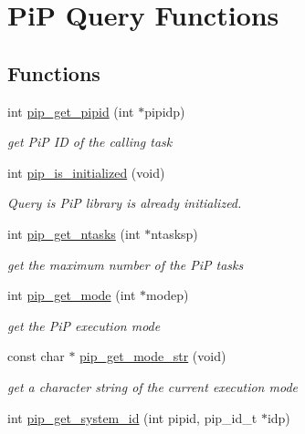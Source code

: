 \hypertarget{group__PiP-4-query}{\section{Pi\-P Query Functions}
\label{group__PiP-4-query}
}
\subsection*{Functions}
\begin{DoxyCompactItemize}
\item 
int \hyperlink{group__PiP-4-query_ga4e715bb8c325e9acc81af0745908dc0e}{pip\-\_\-get\-\_\-pipid} (int $\ast$pipidp)
\begin{DoxyCompactList}\small\item\em get Pi\-P I\-D of the calling task \end{DoxyCompactList}\item 
int \hyperlink{group__PiP-4-query_gabbec4ae2f820b13400f63cba55a53399}{pip\-\_\-is\-\_\-initialized} (void)
\begin{DoxyCompactList}\small\item\em Query is Pi\-P library is already initialized. \end{DoxyCompactList}\item 
int \hyperlink{group__PiP-4-query_ga9786d5aafa2a3882714c35ecc9f39a5a}{pip\-\_\-get\-\_\-ntasks} (int $\ast$ntasksp)
\begin{DoxyCompactList}\small\item\em get the maximum number of the Pi\-P tasks \end{DoxyCompactList}\item 
int \hyperlink{group__PiP-4-query_gab603f68c1ce972a5f3bfb8c95fcfb555}{pip\-\_\-get\-\_\-mode} (int $\ast$modep)
\begin{DoxyCompactList}\small\item\em get the Pi\-P execution mode \end{DoxyCompactList}\item 
const char $\ast$ \hyperlink{group__PiP-4-query_ga0e12c95fe7abc5c356acfd45a89ad5d8}{pip\-\_\-get\-\_\-mode\-\_\-str} (void)
\begin{DoxyCompactList}\small\item\em get a character string of the current execution mode \end{DoxyCompactList}\item 
int \hyperlink{group__PiP-4-query_gadf3d9e96b46d7a58bf4ce6dda173091a}{pip\-\_\-get\-\_\-system\-\_\-id} (int pipid, pip\-\_\-id\-\_\-t $\ast$idp)

\end{DoxyCompactItemize}

